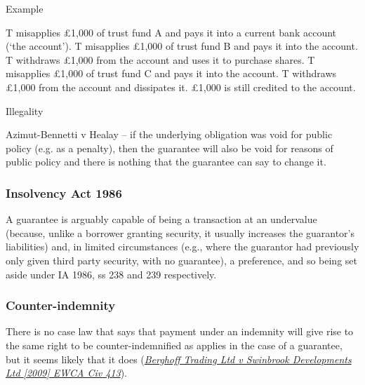 \documentclass[
]{article}
\newenvironment{env-be598745-44b1-4815-8875-ed2abeb511dd}
{
    \savenotes\tcolorbox[blanker,breakable,left=5pt,borderline west={2pt}{-4pt}{cyan}]
}
{
    \endtcolorbox\spewnotes
}
\newenvironment{env-91b82eae-616f-475e-aa24-1cbca07fe183}
{
    \savenotes\tcolorbox[blanker,breakable,left=5pt,borderline west={2pt}{-4pt}{purple}]
}
{
    \endtcolorbox\spewnotes
}
\begin{document}
\begin{env-91b82eae-616f-475e-aa24-1cbca07fe183}

Example

T misapplies £1,000 of trust fund A and pays it into a current bank
account (`the account'). T misapplies £1,000 of trust fund B and pays it
into the account. T withdraws £1,000 from the account and uses it to
purchase shares. T misapplies £1,000 of trust fund C and pays it into
the account. T withdraws £1,000 from the account and dissipates it.
£1,000 is still credited to the account.

\end{env-91b82eae-616f-475e-aa24-1cbca07fe183}

\begin{env-be598745-44b1-4815-8875-ed2abeb511dd}

Illegality

Azimut-Bennetti v Healay -- if the underlying obligation was void for
public policy (e.g. as a penalty), then the guarantee will also be void
for reasons of public policy and there is nothing that the guarantee can
say to change it.

\end{env-be598745-44b1-4815-8875-ed2abeb511dd}

\hypertarget{insolvency-act-1986}{%
\subsubsection{Insolvency Act 1986}\label{insolvency-act-1986}}

A guarantee is arguably capable of being a transaction at an undervalue
(because, unlike a borrower granting security, it usually increases the
guarantor's liabilities) and, in limited circumstances (e.g., where the
guarantor had previously only given third party security, with no
guarantee), a preference, and so being set aside under IA 1986, ss 238
and 239 respectively.

\hypertarget{counter-indemnity}{%
\subsubsection{Counter-indemnity}\label{counter-indemnity}}

There is no case law that says that payment under an indemnity will give
rise to the same right to be counter-indemnified as applies in the case
of a guarantee, but it seems likely that it does
(\emph{\href{https://uk.westlaw.com/D-009-8767?originationContext=document\&transitionType=PLDocumentLink\&contextData=(sc.Default)\&ppcid=9fc18fbc2d79468f9bd5272f7e22e9db}{Berghoff
Trading Ltd v Swinbrook Developments Ltd {[}2009{]} EWCA Civ 413}}).
\end{document}
